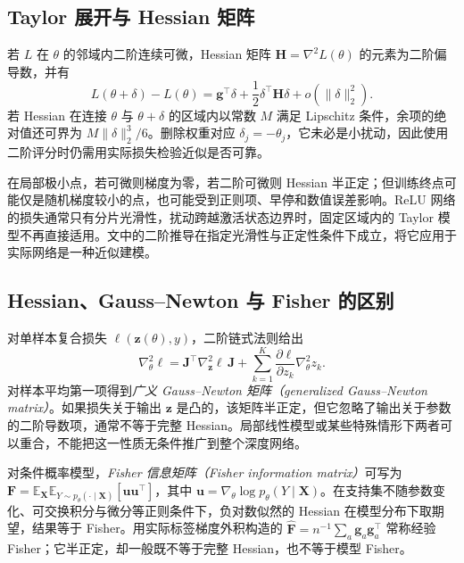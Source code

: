 \documentclass[UTF8,12pt,a4paper,fontset=fandol]{ctexart}
\begin{document}
\subsection{Taylor 展开与 Hessian 矩阵}
若 $L$ 在 $\theta$ 的邻域内二阶连续可微，Hessian 矩阵 $\mathbf H=\nabla^2L(\theta)$ 的元素为二阶偏导数，并有
\begin{equation}
 L(\theta+\delta)-L(\theta)
 =\mathbf g^\top\delta+\frac12\delta^\top\mathbf H\delta
 +o(\|\delta\|_2^2).
 \label{eq:prune-taylor}
\end{equation}
若 Hessian 在连接 $\theta$ 与 $\theta+\delta$ 的区域内以常数 $M$ 满足 Lipschitz 条件，余项的绝对值还可界为 $M\|\delta\|_2^3/6$。删除权重对应 $\delta_j=-\theta_j$，它未必是小扰动，因此使用二阶评分时仍需用实际损失检验近似是否可靠。

在局部极小点，若可微则梯度为零，若二阶可微则 Hessian 半正定；但训练终点可能仅是随机梯度较小的点，也可能受到正则项、早停和数值误差影响。ReLU 网络的损失通常只有分片光滑性，扰动跨越激活状态边界时，固定区域内的 Taylor 模型不再直接适用。文中的二阶推导在指定光滑性与正定性条件下成立，将它应用于实际网络是一种近似建模。

\subsection{Hessian、Gauss--Newton 与 Fisher 的区别}
对单样本复合损失 $\ell(\mathbf z(\theta),y)$，二阶链式法则给出
\begin{equation}
 \nabla_\theta^2\ell
 =\mathbf J^\top\nabla_{\mathbf z}^2\ell\,\mathbf J
 +\sum_{k=1}^K\frac{\partial\ell}{\partial z_k}\nabla_\theta^2z_k.
 \label{eq:prune-hessian-decomposition}
\end{equation}
对样本平均第一项得到\emph{广义 Gauss--Newton 矩阵（generalized Gauss--Newton matrix）}。如果损失关于输出 $\mathbf z$ 是凸的，该矩阵半正定，但它忽略了输出关于参数的二阶导数项，通常不等于完整 Hessian。局部线性模型或某些特殊情形下两者可以重合，不能把这一性质无条件推广到整个深度网络。

对条件概率模型，\emph{Fisher 信息矩阵（Fisher information matrix）}可写为 $\mathbf F=\mathbb E_{\mathbf X}\mathbb E_{Y\sim p_\theta(\cdot\mid\mathbf X)}[\mathbf u\mathbf u^\top]$，其中 $\mathbf u=\nabla_\theta\log p_\theta(Y\mid\mathbf X)$。在支持集不随参数变化、可交换积分与微分等正则条件下，负对数似然的 Hessian 在模型分布下取期望，结果等于 Fisher。用实际标签梯度外积构造的 $\widehat{\mathbf F}=n^{-1}\sum_a\mathbf g_a\mathbf g_a^\top$ 常称经验 Fisher；它半正定，却一般既不等于完整 Hessian，也不等于模型 Fisher。
\end{document}
